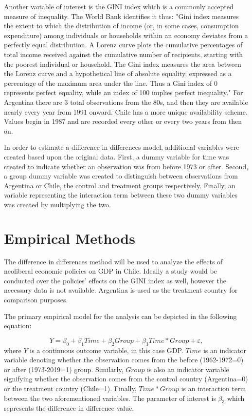 \documentclass[12pt,english]{article}
\begin{document}
Another variable of interest is the GINI index which is a commonly accepted measure of inequality. The World Bank identifies it thus: "Gini index measures the extent to which the distribution of income (or, in some cases, consumption expenditure) among individuals or households within an economy deviates from a perfectly equal distribution. A Lorenz curve plots the cumulative percentages of total income received against the cumulative number of recipients, starting with the poorest individual or household. The Gini index measures the area between the Lorenz curve and a hypothetical line of absolute equality, expressed as a percentage of the maximum area under the line. Thus a Gini index of 0 represents perfect equality, while an index of 100 implies perfect inequality." \citet{} For Argentina there are 3 total observations from the 80s, and then they are available nearly every year from 1991 onward. Chile has a more unique availability scheme. Values begin in 1987 and are recorded every other or every two years from then on. 

In order to estimate a difference in differences model, additional variables were created based upon the original data. First, a dummy variable for time was created to indicate whether an observation was from before 1973 or after. Second, a group dummy variable was created to distinguish between observations from Argentina or Chile, the control and treatment groups respectively. Finally, an variable representing the interaction term between these two dummy variables was created by multiplying the two.   


\section{Empirical Methods}\label{sec:methods}
The difference in differences method will be used to analyze the effects of neoliberal economic policies on GDP in Chile. Ideally a study would be conducted over the policies' effects on the GINI index as well, however the necessary data is not available. Argentina is used as the treatment country for comparison purposes.

The primary empirical model for the analysis can be depicted in the following equation:

\begin{equation}
\label{eq:1}
Y=\beta_{0} + \beta_{1}Time + \beta_{2} Group + \beta_{3}Time*Group + \varepsilon,
\end{equation}
where $Y$ is a continuous outcome variable, in this case GDP. $Time$ is an indicator variable denoting whether the observation comes from the before (1962-1972=0) or after (1973-2019=1) group. Similarly, $Group$ is also an indicator variable signifying whether the observation comes from the control country (Argentina=0) or the treatment country (Chile=1). Finally, $Time*Group$ is an interaction term between the two aforementioned variables. The parameter of interest is $\beta_{3}$ which represents the difference in difference value.
\end{document}
